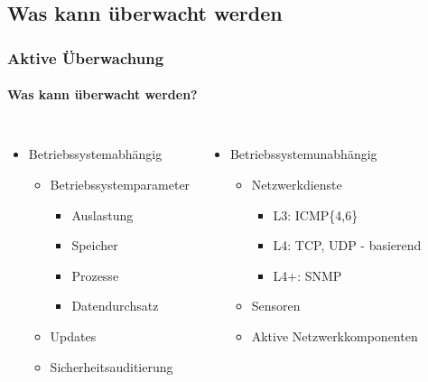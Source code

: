 
\subsection{Was kann überwacht werden}
\begin{frame}
\frametitle{Aktive Überwachung}
\framesubtitle{Was kann überwacht werden?}
    \pause
    \begin{alertblock}{}
    \end{alertblock}

    \vspace{0.5cm}

    \begin{columns}
        \pause
            \begin{itemize}
                \item Betriebssystem\color{red}abhängig
                    \begin{itemize}
                        \item Betriebssystemparameter
                        \begin{itemize}
                            \item   Auslastung
                            \item   Speicher
                            \item   Prozesse
                            \item   Datendurchsatz
                        \end{itemize}
                        \item Updates
                        \item Sicherheitsauditierung
                    \end{itemize}
             \end{itemize}
        \pause
        \begin{itemize}
            \item Betriebssystem\color{red}unabhängig
            \begin{itemize}
                \item Netzwerkdienste
                \begin{itemize}
                    \item L3:   ICMP\{4,6\}
                    \item L4:   TCP, UDP - basierend
                    \item L4+:  SNMP
                \end{itemize}
                \item Sensoren
                \item Aktive Netzwerkkomponenten
            \end{itemize}
        \end{itemize} 
    \end{columns}




\end{frame}

